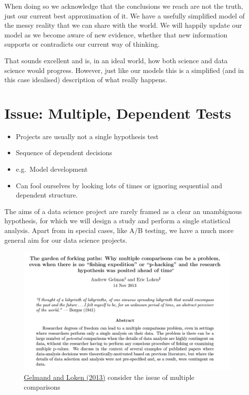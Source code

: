 \documentclass[
  12pt,
]{book}
\begin{document}
When doing so we acknowledge that the conclusions we reach are not the truth, just our current best approximation of it. We have a usefully simplified model of the messy reality that we can share with the world. We will happily update our model as we become aware of new evidence, whether that new information supports or contradicts our current way of thinking.

That sounds excellent and is, in an ideal world, how both science and data science would progress. However, just like our models this is a simplified (and in this case idealised) description of what really happens.

\hypertarget{issue-multiple-dependent-tests}{%
\section{Issue: Multiple, Dependent Tests}\label{issue-multiple-dependent-tests}}

\begin{itemize}
\item
  Projects are usually not a single hypothesis test
\item
  Sequence of dependent decisions
\item
  e.g.~Model development
\item
  Can fool ourselves by looking lots of times or ignoring sequential and dependent structure.
\end{itemize}

The aims of a data science project are rarely framed as a clear an unambiguous hypothesis, for which we will design a study and perform a single statistical analysis. Apart from in special cases, like A/B testing, we have a much more general aim for our data science projects.

\begin{figure}
\centering
\includegraphics{images/401-production-reproducibility/forking-paths-abstract.png}
\caption{\href{http://www.stat.columbia.edu/~gelman/research/unpublished/forking.pdf}{Gelmand and Loken (2013)} consider the issue of multiple comparisons}
\end{figure}
\end{document}
